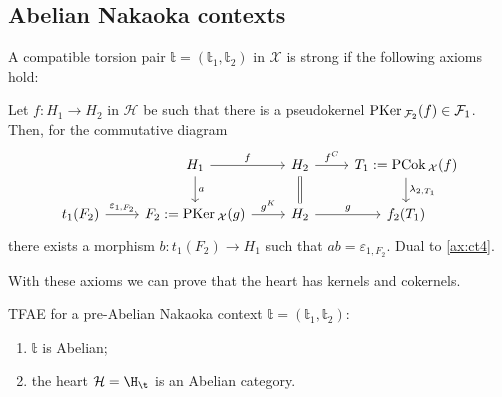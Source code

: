 \subsection{Abelian Nakaoka contexts}


\begin{definition}
  A compatible torsion pair $\mathbb{t}=(\mathbb{t}_1,\mathbb{t}_2)$ in $\mathcal{X}$
  is strong if the following axioms hold:
  \begin{torsionaxioms}
    \setcounter{enumi}{3}
    \item\label{ax:ct4} Let $f:H_1\to H_2$ in $\mathcal{H}$ be such that there is a pseudokernel
    $\mathrm{\textup{PKer\,}}_{\mathcal{F}_2}(f)\in\mathcal{F}_1$. Then, for the commutative diagram
    \begin{equation*}
      \begin{tikzcd}
        & H_1\arrow{d}{a}\arrow{r}{f}
          & H_2\arrow[equal]{d}\arrow{r}{f^C}
            & T_1:=\PCok_\mathcal{X}(f)\arrow{d}{\lambda_{2,T_1}}\\
        t_1(F_2)\arrow{r}{\varepsilon_{1,F_2}}
        & F_2:=\PKer_\mathcal{X}(g)\arrow{r}{g^K}
          & H_2\arrow{r}{g}
            & f_2(T_1)
      \end{tikzcd}
    \end{equation*}
    there exists a morphism $b:t_1(F_2)\to H_1$ such that $ab=\varepsilon_{1,F_2}$.
    \varitem{^\ast}\label{ax:ct4op} Dual to \ref{ax:ct4}.
  \end{torsionaxioms}
\end{definition}

With these axioms we can prove that the heart has kernels and cokernels.

\begin{thm}
TFAE for a pre-Abelian Nakaoka context $\mathbb{t}=(\mathbb{t}_1,\mathbb{t}_2)$:
\begin{enumerate}[label=(\alph*)]
\item $\mathbb{t}$ is Abelian;
\item the heart $\mathcal{H}=\H_\t$ is an Abelian category.
\end{enumerate}
\end{thm}

